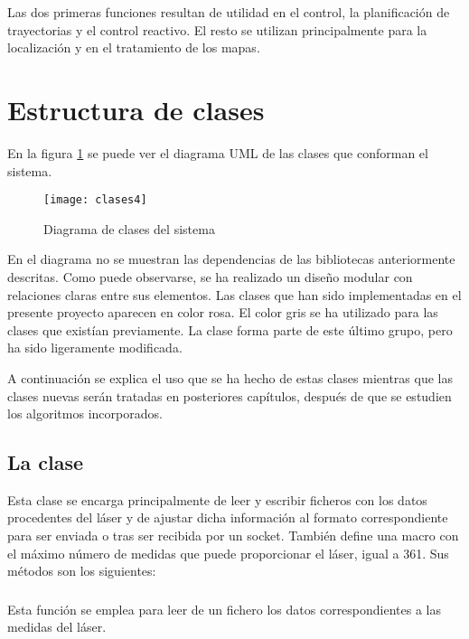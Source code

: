 Las dos primeras funciones resultan de utilidad en el control, la planificación de trayectorias y el control reactivo. El resto se utilizan principalmente para la localización y en el tratamiento de los mapas.

\section{ Estructura de clases}
En la figura \ref{fg:uml} se puede ver el diagrama UML de las clases que conforman el sistema.

\begin{figure}[tbp]
  \centering\texttt{[image: clases4]}\\
  \caption{Diagrama de clases del sistema}\label{fg:uml}
\end{figure}

En el diagrama no se muestran las dependencias de las bibliotecas anteriormente descritas. Como puede observarse, se ha realizado un diseño modular con relaciones claras entre sus elementos. Las clases que han sido implementadas en el presente proyecto aparecen en color rosa. El color gris se ha utilizado para las clases que existían previamente. La clase  forma parte de este último grupo, pero ha sido ligeramente modificada.

A continuación se explica el uso que se ha hecho de estas clases mientras que las clases nuevas serán tratadas en posteriores capítulos, después de que se estudien los algoritmos incorporados.

\subsection{La clase }
Esta clase se encarga principalmente de leer y escribir ficheros con los datos procedentes del láser y de ajustar dicha información al formato correspondiente para ser enviada o tras ser recibida por un socket. También define una macro con el máximo número de medidas que puede proporcionar el láser, igual a 361.
Sus métodos son los siguientes:

\subsubsection{}

\noindent
{}

\noindent
Esta función se emplea para leer de un fichero los datos correspondientes a las medidas del láser.

